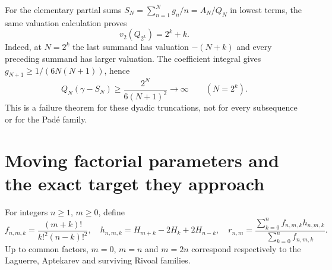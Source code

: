 \documentclass[11pt,a4paper]{article}
\theoremstyle{definition}
\theoremstyle{remark}
\numberwithin{equation}{section}
\begin{document}
For the elementary partial sums $S_N=\sum_{n=1}^Ng_n/n=A_N/Q_N$ in
lowest terms, the same valuation calculation proves
\[
 v_2(Q_{2^k})=2^k+k.
\]
Indeed, at $N=2^k$ the last summand has valuation $-(N+k)$ and every
preceding summand has larger valuation.  The coefficient integral gives
$g_{N+1}\ge1/(6N(N+1))$, hence
\[
 Q_N(\gamma-S_N)\ge\frac{2^N}{6(N+1)^2}\longrightarrow\infty
 \qquad(N=2^k).
\]
This is a failure theorem for these dyadic truncations, not for every
subsequence or for the Pad\'e family.

\section{Moving factorial parameters and the exact target they approach}
\label{ec:moving}

For integers $n\ge1$, $m\ge0$, define
\[
 f_{n,m,k}=\frac{(m+k)!}{k!^2(n-k)!^2},\quad
 h_{n,m,k}=H_{m+k}-2H_k+2H_{n-k},\quad
 r_{n,m}=\frac{\sum_{k=0}^nf_{n,m,k}h_{n,m,k}}
                 {\sum_{k=0}^nf_{n,m,k}}.
\]
Up to common factors, $m=0$, $m=n$ and $m=2n$ correspond respectively
to the Laguerre, Aptekarev and surviving Rivoal families.
\end{document}
